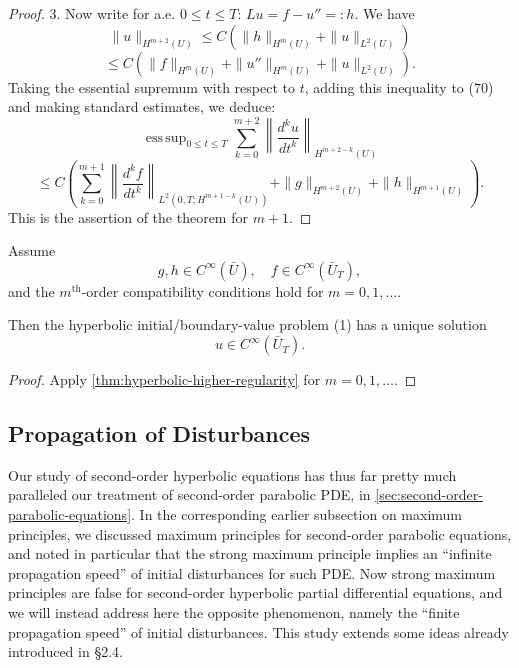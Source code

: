 \begin{proof}
3. Now write for a.e. $0 \leq t \leq T$: $Lu = f - u'' =: h$. We have
\[
\|u\|_{H^{m+2}(U)} \leq C(\|h\|_{H^m(U)} + \|u\|_{L^2(U)})
\]
\[
\leq C(\|f\|_{H^m(U)} + \|u''\|_{H^m(U)} + \|u\|_{L^2(U)}).
\]
Taking the essential supremum with respect to $t$, adding this inequality to (70) and making standard estimates, we deduce:
\[
\operatorname{ess\,sup}_{0\leq t \leq T} \sum_{k=0}^{m+2} \left\|\frac{d^k u}{dt^k}\right\|_{H^{m+2-k}(U)}
\]
\[
\leq C\left(\sum_{k=0}^{m+1} \left\|\frac{d^k f}{dt^k}\right\|_{L^2(0,T;H^{m+1-k}(U))} + \|g\|_{H^{m+2}(U)} + \|h\|_{H^{m+1}(U)}\right).
\]
This is the assertion of the theorem for $m + 1$.
\end{proof}

\begin{theorem}
\label{thm:hyperbolic-infinite-differentiability}
Assume
\[
g, h \in C^\infty(\bar{U}), \quad f \in C^\infty(\bar{U}_T),
\]
and the $m^{\text{th}}$-order compatibility conditions hold for $m = 0, 1, \ldots$.

Then the hyperbolic initial/boundary-value problem (1) has a unique solution
\[
u \in C^\infty(\bar{U}_T).
\]
\end{theorem}

\begin{proof}
Apply \cref{thm:hyperbolic-higher-regularity} for $m = 0, 1, \ldots$.
\end{proof}

\subsection{Propagation of Disturbances}

\begin{figure}[h]\centering
\end{figure}

Our study of second-order hyperbolic equations has thus far pretty much paralleled our treatment of second-order parabolic PDE, in \cref{sec:second-order-parabolic-equations}. In the corresponding earlier subsection on maximum principles, we discussed maximum principles for second-order parabolic equations, and noted in particular that the strong maximum principle implies an ``infinite propagation speed'' of initial disturbances for such PDE. Now strong maximum principles are false for second-order hyperbolic partial differential equations, and we will instead address here the opposite phenomenon, namely the ``finite propagation speed'' of initial disturbances. This study extends some ideas already introduced in \S2.4.

